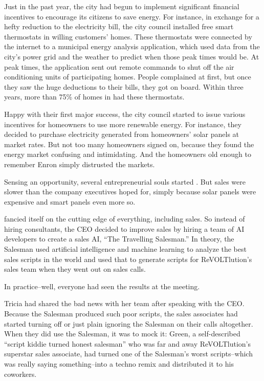 Just in the past year, the city had begun to implement significant financial incentives to encourage its citizens to save energy. For instance, in exchange for a hefty reduction to the electricity bill, the city council installed free smart thermostats in willing customers' homes. These thermostats were connected by the internet to a municipal energy analysis application, which used data from the city's power grid and the weather to predict when those peak times would be. At peak times, the application sent out remote commands to shut off the air conditioning units of participating homes. People complained at first, but once they saw the huge deductions to their bills, they got on board. Within three years, more than 75\% of homes in \crunchyCity{} had these thermostats.

Happy with their first major success, the city council started to issue various incentives for homeowners to use more renewable energy. For instance, they decided to purchase electricity generated from homeowners' solar panels at market rates. But not too many homeowners signed on, because they found the energy market confusing and intimidating. And the homeowners old enough to remember Enron simply distrusted the markets.
 
Sensing an opportunity, several entrepreneurial souls started \energyCompany{}. But sales were slower than the company executives hoped for, simply because solar panels were expensive and smart panels even more so.
 
\energyCompany{} fancied itself on the cutting edge of everything, including sales. So instead of hiring consultants, the CEO decided to improve sales by hiring a team of AI developers to create a sales AI, ``The Travelling Salesman.'' In theory, the Salesman used artificial intelligence and machine learning to analyze the best sales scripts in the world and used that to generate scripts for ReVOLTlution's sales team when they went out on sales calls.

In practice--well, everyone had seen the results at the meeting.

Tricia had shared the bad news with her team after speaking with the CEO. Because the Salesman produced such poor scripts, the sales associates had started turning off or just plain ignoring the Salesman on their calls altogether. When they did use the Salesman, it was to mock it: {\energyJerk} Green, a self-described ``script kiddie turned honest salesman'' who was far and away ReVOLTlution's superstar sales associate, had turned one of the Salesman's worst scripts--which was really saying something--into a techno remix and distributed it to his coworkers.

